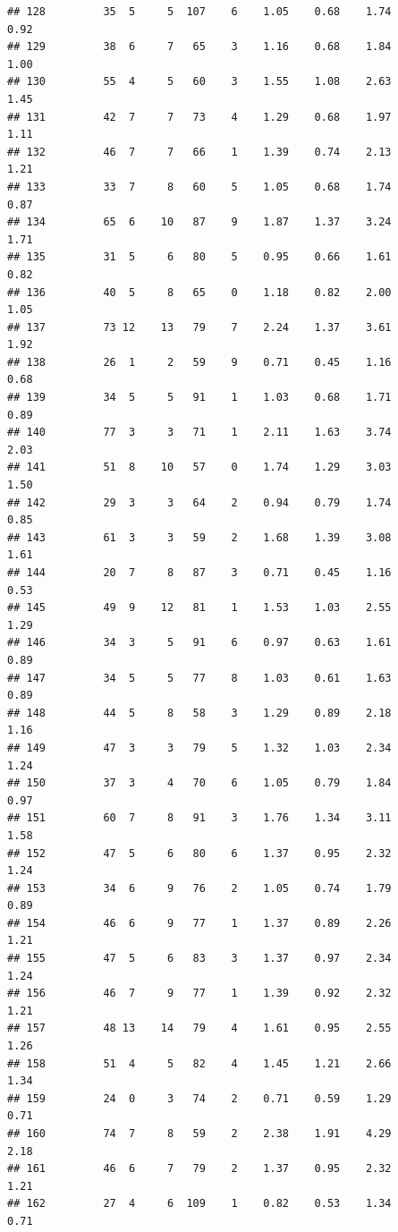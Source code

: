 \documentclass[
]{book}
\theoremstyle{definition}
\theoremstyle{definition}
\theoremstyle{definition}
\theoremstyle{definition}
\theoremstyle{remark}
\begin{document}
\begin{verbatim}
## 128         35  5     5  107    6    1.05    0.68    1.74           0.92
## 129         38  6     7   65    3    1.16    0.68    1.84           1.00
## 130         55  4     5   60    3    1.55    1.08    2.63           1.45
## 131         42  7     7   73    4    1.29    0.68    1.97           1.11
## 132         46  7     7   66    1    1.39    0.74    2.13           1.21
## 133         33  7     8   60    5    1.05    0.68    1.74           0.87
## 134         65  6    10   87    9    1.87    1.37    3.24           1.71
## 135         31  5     6   80    5    0.95    0.66    1.61           0.82
## 136         40  5     8   65    0    1.18    0.82    2.00           1.05
## 137         73 12    13   79    7    2.24    1.37    3.61           1.92
## 138         26  1     2   59    9    0.71    0.45    1.16           0.68
## 139         34  5     5   91    1    1.03    0.68    1.71           0.89
## 140         77  3     3   71    1    2.11    1.63    3.74           2.03
## 141         51  8    10   57    0    1.74    1.29    3.03           1.50
## 142         29  3     3   64    2    0.94    0.79    1.74           0.85
## 143         61  3     3   59    2    1.68    1.39    3.08           1.61
## 144         20  7     8   87    3    0.71    0.45    1.16           0.53
## 145         49  9    12   81    1    1.53    1.03    2.55           1.29
## 146         34  3     5   91    6    0.97    0.63    1.61           0.89
## 147         34  5     5   77    8    1.03    0.61    1.63           0.89
## 148         44  5     8   58    3    1.29    0.89    2.18           1.16
## 149         47  3     3   79    5    1.32    1.03    2.34           1.24
## 150         37  3     4   70    6    1.05    0.79    1.84           0.97
## 151         60  7     8   91    3    1.76    1.34    3.11           1.58
## 152         47  5     6   80    6    1.37    0.95    2.32           1.24
## 153         34  6     9   76    2    1.05    0.74    1.79           0.89
## 154         46  6     9   77    1    1.37    0.89    2.26           1.21
## 155         47  5     6   83    3    1.37    0.97    2.34           1.24
## 156         46  7     9   77    1    1.39    0.92    2.32           1.21
## 157         48 13    14   79    4    1.61    0.95    2.55           1.26
## 158         51  4     5   82    4    1.45    1.21    2.66           1.34
## 159         24  0     3   74    2    0.71    0.59    1.29           0.71
## 160         74  7     8   59    2    2.38    1.91    4.29           2.18
## 161         46  6     7   79    2    1.37    0.95    2.32           1.21
## 162         27  4     6  109    1    0.82    0.53    1.34           0.71

\end{verbatim}
\end{document}
